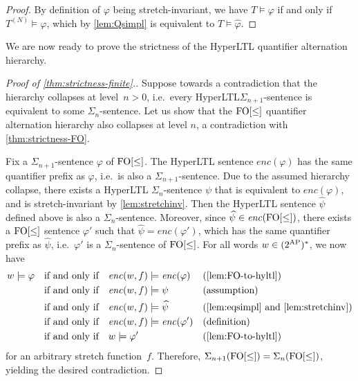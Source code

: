 \documentclass[dvipsnames,10pt,a4paper]{amsart}
\theoremstyle{definition}
\theoremstyle{remark}
\newcommand{\hyltl}{{HyperLTL}\xspace}
\newcommand\FO{\textup{FO}}
\newcommand\simpleHyperLTL{\encPhi {\FOw}}
\newcommand\AP{\textup{AP}}
\newcommand\FOw{\FO[\le]}
\newcommand\Sfo[1]{\Sigma_{#1}(\FOw)}
\newcommand\enc[2]{\mathit{enc}(#1,#2)}
\newcommand\tn[2]{#1^{(#2)}}
\newcommand\encPhi[1]{\mathit{enc}(#1)}
\newcommand\simpl[1]{\widehat {#1}}
\begin{document}
\begin{proof}
  By definition of $\varphi$ being stretch-invariant, we have
  $T \models \varphi$ if and only if
  $\tn T N \models \varphi$, which by \autoref{lem:Qsimpl} is
  equivalent to $T \models \simpl \varphi$.
\end{proof}


We are now ready to prove the strictness of the \hyltl quantifier alternation
hierarchy.

\begin{proof}[Proof of \autoref{thm:strictness-finite}.]
  Suppose towards a contradiction that the hierarchy collapses at
  level~$n > 0$, i.e.\ every \hyltl $\Sigma_{n+1}$-sentence is equivalent to some
  $\Sigma_n$-sentence.
  Let us show that the $\FOw$ quantifier alternation hierarchy also
  collapses at level $n$, a contradiction with \autoref{thm:strictness-FO}.

  Fix a $\Sigma_{n+1}$-sentence $\varphi$ of $\FOw$.
  The \hyltl sentence $\encPhi \varphi$ has the same quantifier prefix as
  $\varphi$, i.e.\ is also a $\Sigma_{n+1}$-sentence.
  Due to the assumed hierarchy collapse, there exists a  \hyltl
  $\Sigma_n$-sentence $\psi$ that is equivalent to $\encPhi \varphi$,
  and is stretch-invariant by \autoref{lem:stretchinv}.
  Then the \hyltl sentence $\simpl \psi$ defined above is also a $\Sigma_n$-sentence.
  Moreover, since $\simpl \psi \in \simpleHyperLTL$, there exists
  a $\FOw$ sentence $\varphi'$ such that $\simpl \psi = \encPhi {\varphi'}$,
which has the same quantifier prefix as $\simpl \psi$, i.e.\
  $\varphi'$ is a $\Sigma_n$-sentence of $\FOw$.
  For all words $w \in (2^\AP)^\ast$, we now have
  \begin{align*}
    w \models \varphi
    & \quad\text{if and only if}\quad \enc w f \models \encPhi \varphi
    && \text{(\autoref{lem:FO-to-hyltl})} \\
    & \quad\text{if and only if}\quad \enc w f \models \psi
    && \text{(assumption)} \\
    & \quad\text{if and only if}\quad \enc w f \models \simpl \psi
    && (\text{\autoref{lem:eqsimpl} and \autoref{lem:stretchinv}}) \\
    & \quad\text{if and only if}\quad \enc w f \models \encPhi {\varphi'}
    && (\text{definition}) \\
    & \quad\text{if and only if}\quad w \models \varphi'
    && \text{(\autoref{lem:FO-to-hyltl})}
  \end{align*}
  for an arbitrary stretch function~$f$.
  Therefore, $\Sfo {n+1} = \Sfo n$,  yielding the desired contradiction.


\end{proof}
\end{document}
